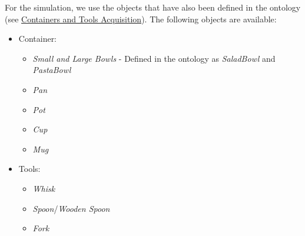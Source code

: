 For the simulation, we use the objects that have also been defined in the ontology (see \hyperref[sec:ContainersAndToolsAcquisition]{Containers and Tools Acquisition}).
The following objects are available:
\begin{itemize}
	\item Container: 
        \begin{itemize} 
            \item \textit{Small and Large Bowls} - Defined in the ontology as \textit{SaladBowl} and \textit{PastaBowl}
            \item \textit{Pan}
            \item \textit{Pot}
            \item \textit{Cup}
            \item \textit{Mug}
        \end{itemize}
	\item Tools: 
        \begin{itemize}
            \item \textit{Whisk}
            \item \textit{Spoon}/\textit{Wooden Spoon}
            \item \textit{Fork}
        \end{itemize}
\end{itemize}

